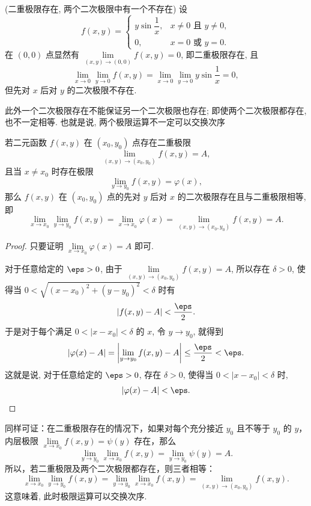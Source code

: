 \begin{example}(二重极限存在, 两个二次极限中有一个不存在)
	设
	\[
	f(x, y) = \begin{cases}
		y \sin \dfrac{1}{x}, & x \neq 0 \text{ 且 } y \neq 0, \\
		0, & x = 0 \text{ 或 } y = 0.
	\end{cases}
	\]
	在 $(0, 0)$ 点显然有 $\lim\limits_{(x, y) \to (0, 0)} f(x, y) = 0$, 即二重极限存在, 且
	\[
	\lim_{x \to 0} \lim_{y \to 0} f(x, y) = \lim_{x\to 0} \lim_{y \to 0} y \sin \frac{1}{x} = 0,
	\]
	但先对 $x$ 后对 $y$ 的二次极限不存在.

	此外一个二次极限存在不能保证另一个二次极限也存在; 即使两个二次极限都存在, 也不一定相等. 也就是说, 两个极限运算不一定可以交换次序 
\end{example}

\begin{proposition}
	若二元函数 $f(x, y)$ 在 $(x_0, y_0)$ 点存在二重极限
	\[
	\lim\limits_{(x, y) \to (x_0, y_0)} f(x, y) = A,
	\]
	且当 $x \neq x_0$ 时存在极限
	\[
	\lim_{y \to y_0} f(x, y) = \varphi(x),
	\]
	那么 $f(x, y)$ 在 $(x_0, y_0)$ 点的先对 $y$ 后对 $x$ 的二次极限存在且与二重极限相等, 即
	\[
	\lim_{x \to x_0} \lim_{y \to y_0} f(x, y) = \lim_{x \to x_0} \varphi(x) = \lim\limits_{(x, y) \to (x_0, y_0)} f(x, y) = A.
	\]
\end{proposition}

\begin{proof}
	只要证明 $\lim\limits_{x \to x_0} \varphi(x) = A$ 即可.

	对于任意给定的 $\eps > 0$, 由于 $\lim\limits_{(x, y) \to (x_0, y_0)} f(x, y) = A$, 所以存在 $\delta > 0$, 使得当 $0 < \sqrt{(x - x_0)^2 + (y - y_0)^2} < \delta$ 时有
	\[
	|f(x, y) - A| < \frac{\eps}{2}.
	\]
	于是对于每个满足 $0 < |x - x_0| < \delta$ 的 $x$, 令 $y \to y_0$, 就得到
	\[
	|\varphi(x) - A| = \left| \lim_{y \to y_0} f(x, y) - A \right| \le \frac{\eps}{2} < \eps.
	\]
	这就是说, 对于任意给定的 $\eps > 0$, 存在 $\delta > 0$, 使得当 $0 < |x - x_0| < \delta$ 时,
	\[
	|\varphi(x) - A| < \eps.
	\]
\end{proof}

同样可证：在二重极限存在的情况下，如果对每个充分接近 $y_0$ 且不等于 $y_0$ 的 $y$，内层极限 $\lim\limits_{x\to x_0}f(x,y)=\psi(y)$ 存在，那么
\[
\lim_{y\to y_0}\lim_{x\to x_0}f(x,y)
=\lim_{y\to y_0}\psi(y)=A.
\]
所以，若二重极限及两个二次极限都存在，则三者相等：
\[
\lim_{x\to x_0}\lim_{y\to y_0}f(x,y)
=\lim_{y\to y_0}\lim_{x\to x_0}f(x,y)
=\lim_{(x,y)\to(x_0,y_0)}f(x,y).
\]
这意味着, 此时极限运算可以交换次序.



